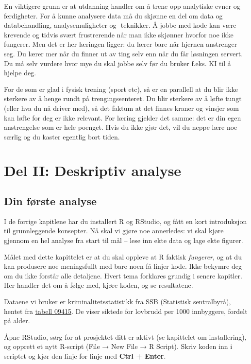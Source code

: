 \documentclass[
  norsk,
  letterpaper,
  DIV=11,
  numbers=noendperiod]{scrreprt}
\theoremstyle{definition}
\theoremstyle{remark}
\begin{document}
En viktigere grunn er at utdanning handler om å trene opp analytiske
evner og ferdigheter. For å kunne analysere data må du skjønne en del om
data og databehandling, analysemuligheter og -teknikker. Å jobbe med
kode kan være krevende og tidvis svært frustrerende når man ikke
skjønner hvorfor noe ikke fungerer. Men det er her læringen ligger: du
lærer bare når hjernen anstrenger seg. Du lærer mer når du finner ut av
ting selv enn når du får løsningen servert. Du må selv vurdere hvor mye
du skal jobbe selv før du bruker f.eks. KI til å hjelpe deg.

For de som er glad i fysisk trening (sport etc), så er en parallell at
du blir ikke sterkere av å henge rundt på trengingssenteret. Du blir
sterkere av å løfte tungt (eller hva du nå driver med), så det faktum at
det finnes kraner og vinsjer som kan løfte for deg er ikke relevant. For
læring gjelder det samme: det er din egen anstrengelse som er hele
poenget. Hvis du ikke gjør det, vil du neppe lære noe særlig og du
kaster egentlig bort tiden.

\part{Del II: Deskriptiv analyse}

\chapter{Din første analyse}\label{din-fuxf8rste-analyse}

I de forrige kapitlene har du installert R og RStudio, og fått en kort
introduksjon til grunnleggende konsepter. Nå skal vi gjøre noe
annerledes: vi skal kjøre gjennom en hel analyse fra start til mål --
lese inn ekte data og lage ekte figurer.

Målet med dette kapittelet er at du skal oppleve at R faktisk
\emph{fungerer}, og at du kan produsere noe meningsfullt med bare noen
få linjer kode. Ikke bekymre deg om du ikke forstår alle detaljene.
Hvert tema forklares grundig i senere kapitler. Her handler det om å
følge med, kjøre koden, og se resultatene.

Dataene vi bruker er kriminalitetsstatistikk fra SSB (Statistisk
sentralbyrå), hentet fra
\href{https://www.ssb.no/statbank/table/09415}{tabell 09415}. De viser
siktede for lovbrudd per 1000 innbyggere, fordelt på alder.

Åpne RStudio, sørg for at prosjektet ditt er aktivt (se kapittelet om
installering), og opprett et nytt R-script (File → New File → R Script).
Skriv koden inn i scriptet og kjør den linje for linje med \textbf{Ctrl
+ Enter}.
\end{document}
